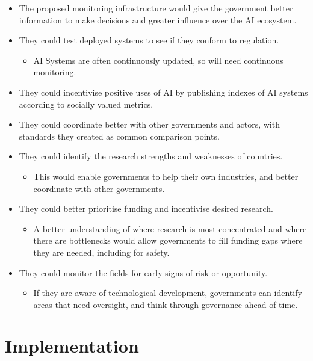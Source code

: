 \documentclass{article}
\begin{document}
\begin{multicols}{2}
\begin{itemize}
\item The proposed monitoring infrastructure would give the government better information to make decisions and greater influence over the AI ecosystem.
\item They could test deployed systems to see if they conform to regulation.
    \begin{itemize}
    \item AI Systems are often continuously updated, so will need continuous monitoring.
    \end{itemize}
\item They could incentivise positive uses of AI by publishing indexes of AI systems according to socially valued metrics.
\item They could coordinate better with other governments and actors, with standards they created as common comparison points.
\item They could identify the research strengths and weaknesses of countries.
    \begin{itemize}
    \item This would enable governments to help their own industries, and better coordinate with other governments.
    \end{itemize}
\item They could better prioritise funding and incentivise desired research.
    \begin{itemize}
    \item A better understanding of where research is most concentrated and where there are bottlenecks would allow governments to fill funding gaps where they are needed, including for safety.
    \end{itemize}
\item They could monitor the fields for early signs of risk or opportunity.
    \begin{itemize}
    \item If they are aware of technological development, governments can identify areas that need oversight, and think through governance ahead of time.
    \end{itemize}
\end{itemize}

\section*{Implementation}


\end{multicols}
\end{document}
